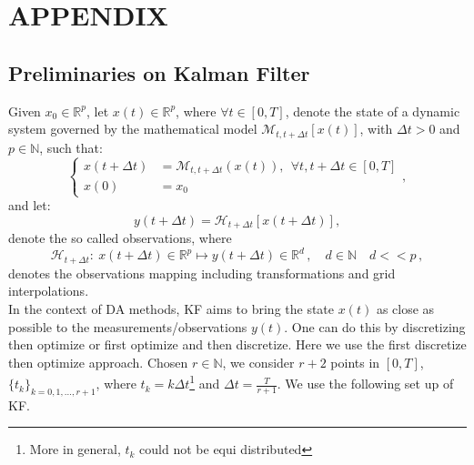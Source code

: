 \section{APPENDIX }\label{section1}

\subsection{Preliminaries on Kalman Filter}
Given $x_{0}\in \mathbb{R}^{p}$, let $x(t)\in \mathbb{R}^{p}$, where $\forall t\in [0,T]$, denote the state of a dynamic system governed by the mathematical model $\mathcal{M}_{t,t+\Delta t}[ x(t)]$, with $\Delta t>0$ and $p\in\mathbb{N}$, such that:
\begin{equation}\label{modello}
\left\{\begin{array}{ll}
x(t+ \Delta t)&=\mathcal{M}_{t, t+ \Delta t}(x(t)), \ \ \forall t,t+\Delta t \in [0,T]\\
x(0)&=x_{0}
\end{array}, \right.
\end{equation}  
and let:
\begin{equation}\label{osservazioni}
y(t+\Delta t)=\mathcal{H}_{t+\Delta t}[x(t+\Delta t)],
\end{equation}
denote the so called observations, where 
\begin{equation}
\mathcal{H}_{t+\Delta t}: \ x(t+\Delta t) \in \mathbb{R}^{p}\mapsto y(t+\Delta t) \in \mathbb{R}^{d}\,, \quad d \in \mathbb{N} \quad d <<p \, ,
\end{equation}
denotes the observations mapping including transformations and grid interpolations.\\
In the context of DA methods, KF aims to bring the state $x(t)$ as close as possible to the measurements/observations $y(t)$. One can do this by discretizing  then optimize or first optimize and then discretize. Here we use the first discretize then optimize approach. Chosen $r\in \mathbb{N}$, we consider $r+2$ points in $[0,T]$, $\{t_{k}\}_{k=0,1,\ldots,r+1}$,  where $t_{k}=k\Delta t$\footnote{More in general, $t_k$ could not be equi distributed} and $\Delta t= \frac{T}{r+1}$. We use the following set up of  KF. \\

